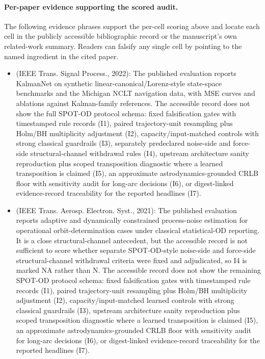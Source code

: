 \paragraph{Per-paper evidence supporting the scored audit.}\label{par:novelty-audit-evidence}
The following evidence phrases support the per-cell scoring above and locate each cell in the publicly accessible bibliographic record or the manuscript's own related-work summary. Readers can falsify any single cell by pointing to the named ingredient in the cited paper.
\begin{itemize}[leftmargin=*]
  \item \cite{revach2022kalmannet} (IEEE Trans. Signal Process., 2022): The published evaluation reports KalmanNet on synthetic linear-canonical/Lorenz-style state-space benchmarks and the Michigan NCLT navigation data, with MSE curves and ablations against Kalman-family references. The accessible record does not show the full SPOT-OD protocol schema: fixed falsification gates with timestamped rule records (I1), paired trajectory-unit resampling plus Holm/BH multiplicity adjustment (I2), capacity/input-matched controls with strong classical guardrails (I3), separately predeclared noise-side and force-side structural-channel withdrawal rules (I4), upstream architecture sanity reproduction plus scoped transposition diagnostic where a learned transposition is claimed (I5), an approximate astrodynamics-grounded CRLB floor with sensitivity audit for long-arc decisions (I6), or digest-linked evidence-record traceability for the reported headlines (I7).
  \item \cite{stacey2021adaptive} (IEEE Trans. Aerosp. Electron. Syst., 2021): The published evaluation reports adaptive and dynamically constrained process-noise estimation for operational orbit-determination cases under classical statistical-OD reporting. It is a close structural-channel antecedent, but the accessible record is not sufficient to score whether separate SPOT-OD-style noise-side and force-side structural-channel withdrawal criteria were fixed and adjudicated, so I4 is marked NA rather than N. The accessible record does not show the remaining SPOT-OD protocol schema: fixed falsification gates with timestamped rule records (I1), paired trajectory-unit resampling plus Holm/BH multiplicity adjustment (I2), capacity/input-matched learned controls with strong classical guardrails (I3), upstream architecture sanity reproduction plus scoped transposition diagnostic where a learned transposition is claimed (I5), an approximate astrodynamics-grounded CRLB floor with sensitivity audit for long-arc decisions (I6), or digest-linked evidence-record traceability for the reported headlines (I7).

\end{itemize}

